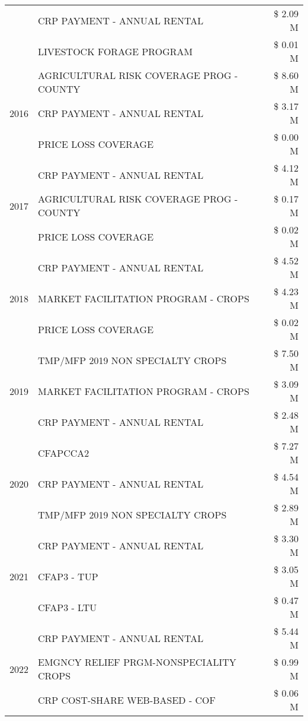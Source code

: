 \begin{tabular}{llr}
 & CRP PAYMENT - ANNUAL RENTAL & \$ 2.09 M \\
 & LIVESTOCK FORAGE PROGRAM & \$ 0.01 M \\
\cline{1-3}
\multirow[t]{3}{*}{2016} & AGRICULTURAL RISK COVERAGE PROG - COUNTY & \$ 8.60 M \\
 & CRP PAYMENT - ANNUAL RENTAL & \$ 3.17 M \\
 & PRICE LOSS COVERAGE & \$ 0.00 M \\
\cline{1-3}
\multirow[t]{3}{*}{2017} & CRP PAYMENT - ANNUAL RENTAL & \$ 4.12 M \\
 & AGRICULTURAL RISK COVERAGE PROG - COUNTY & \$ 0.17 M \\
 & PRICE LOSS COVERAGE & \$ 0.02 M \\
\cline{1-3}
\multirow[t]{3}{*}{2018} & CRP PAYMENT - ANNUAL RENTAL & \$ 4.52 M \\
 & MARKET FACILITATION PROGRAM - CROPS & \$ 4.23 M \\
 & PRICE LOSS COVERAGE & \$ 0.02 M \\
\cline{1-3}
\multirow[t]{3}{*}{2019} & TMP/MFP 2019 NON SPECIALTY CROPS & \$ 7.50 M \\
 & MARKET FACILITATION PROGRAM - CROPS & \$ 3.09 M \\
 & CRP PAYMENT - ANNUAL RENTAL & \$ 2.48 M \\
\cline{1-3}
\multirow[t]{3}{*}{2020} & CFAPCCA2 & \$ 7.27 M \\
 & CRP PAYMENT - ANNUAL RENTAL & \$ 4.54 M \\
 & TMP/MFP 2019 NON SPECIALTY CROPS & \$ 2.89 M \\
\cline{1-3}
\multirow[t]{3}{*}{2021} & CRP PAYMENT - ANNUAL RENTAL & \$ 3.30 M \\
 & CFAP3 - TUP & \$ 3.05 M \\
 & CFAP3 - LTU & \$ 0.47 M \\
\cline{1-3}
\multirow[t]{3}{*}{2022} & CRP PAYMENT - ANNUAL RENTAL & \$ 5.44 M \\
 & EMGNCY RELIEF PRGM-NONSPECIALITY CROPS & \$ 0.99 M \\
 & CRP COST-SHARE WEB-BASED - COF & \$ 0.06 M \\
\cline{1-3}
\bottomrule
\end{tabular}
